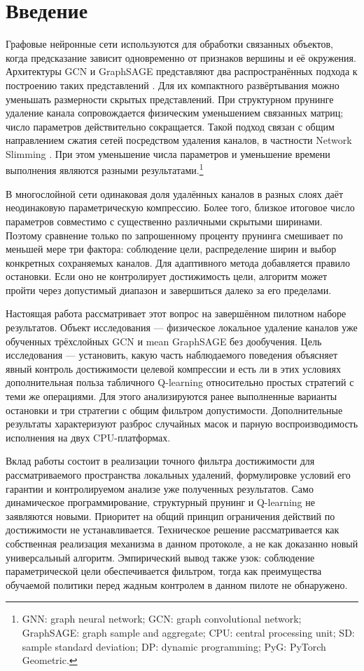 \documentclass[10pt,a4paper]{article}
\begin{document}
\section*{Введение}
Графовые нейронные сети используются для обработки связанных объектов, когда предсказание зависит одновременно от признаков вершины и её окружения. Архитектуры GCN и GraphSAGE представляют два распространённых подхода к построению таких представлений \cite{r1,r2}. Для их компактного развёртывания можно уменьшать размерности скрытых представлений. При структурном прунинге удаление канала сопровождается физическим уменьшением связанных матриц; число параметров действительно сокращается. Такой подход связан с общим направлением сжатия сетей посредством удаления каналов, в частности Network Slimming \cite{r3}. При этом уменьшение числа параметров и уменьшение времени выполнения являются разными результатами.\footnote{GNN: graph neural network; GCN: graph convolutional network; GraphSAGE: graph sample and aggregate; CPU: central processing unit; SD: sample standard deviation; DP: dynamic programming; PyG: PyTorch Geometric.}

В многослойной сети одинаковая доля удалённых каналов в разных слоях даёт неодинаковую параметрическую компрессию. Более того, близкое итоговое число параметров совместимо с существенно различными скрытыми ширинами. Поэтому сравнение только по запрошенному проценту прунинга смешивает по меньшей мере три фактора: соблюдение цели, распределение ширин и выбор конкретных сохраняемых каналов. Для адаптивного метода добавляется правило остановки. Если оно не контролирует достижимость цели, алгоритм может пройти через допустимый диапазон и завершиться далеко за его пределами.

Настоящая работа рассматривает этот вопрос на завершённом пилотном наборе результатов. Объект исследования — физическое локальное удаление каналов уже обученных трёхслойных GCN и mean GraphSAGE без дообучения. Цель исследования — установить, какую часть наблюдаемого поведения объясняет явный контроль достижимости целевой компрессии и есть ли в этих условиях дополнительная польза табличного Q-learning относительно простых стратегий с теми же операциями. Для этого анализируются ранее выполненные варианты остановки и три стратегии с общим фильтром допустимости. Дополнительные результаты характеризуют разброс случайных масок и парную воспроизводимость исполнения на двух CPU-платформах.

Вклад работы состоит в реализации точного фильтра достижимости для рассматриваемого пространства локальных удалений, формулировке условий его гарантии и контролируемом анализе уже полученных результатов. Само динамическое программирование, структурный прунинг и Q-learning не заявляются новыми. Приоритет на общий принцип ограничения действий по достижимости не устанавливается. Техническое решение рассматривается как собственная реализация механизма в данном протоколе, а не как доказанно новый универсальный алгоритм. Эмпирический вывод также узок: соблюдение параметрической цели обеспечивается фильтром, тогда как преимущества обучаемой политики перед жадным контролем в данном пилоте не обнаружено.
\end{document}
